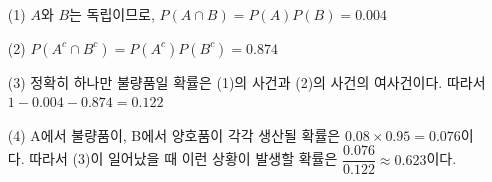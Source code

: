 \begin{itemize}
	\item[(1)] $A$와 $B$는 독립이므로, $P\left(A\cap B\right) = P\left(A\right)P\left(B\right) = 0.004$
	\item[(2)] $P\left(A^c\cap B^c\right) = P\left(A^c\right)P\left(B^c\right) = 0.874$
	\item[(3)] 정확히 하나만 불량품일 확률은 (1)의 사건과 (2)의 사건의 여사건이다. 따라서 $1 - 0.004 - 0.874 = 0.122$
	\item[(4)] A에서 불량품이, B에서 양호품이 각각 생산될 확률은 $0.08\times 0.95=0.076$이다. 따라서 (3)이 일어났을 때 이런 상황이 발생할 확률은 $\dfrac{0.076}{0.122} \approx 0.623$이다.
\end{itemize}